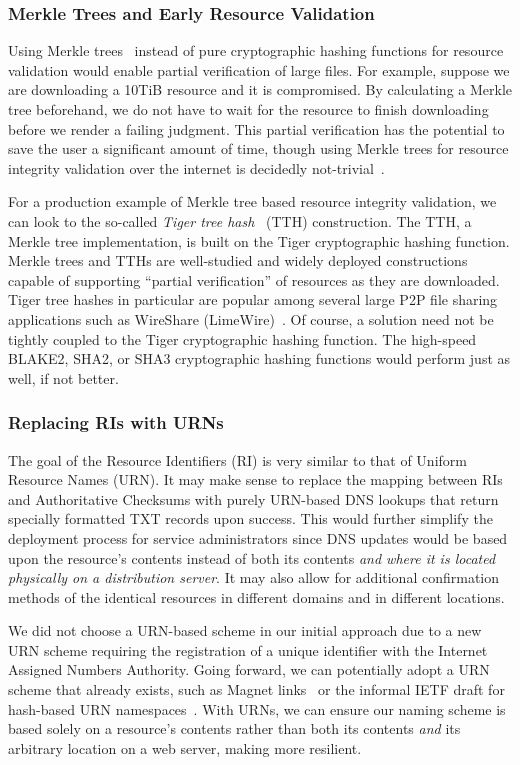\subsubsection{Merkle Trees and Early Resource Validation}

Using Merkle trees~\cite{Merkle} instead of pure cryptographic hashing functions
for resource validation would enable partial verification of large files. For
example, suppose we are downloading a 10TiB resource and it is compromised. By
calculating a Merkle tree beforehand, we do not have to wait for the resource to
finish downloading before we render a failing judgment. This partial verification has the potential
to save the user a significant amount of time, though using Merkle trees for
resource integrity validation over the internet is decidedly
not-trivial~\cite{Merkle-HTTP}.

For a production example of Merkle tree based resource integrity validation, we
can look to the so-called \emph{Tiger tree hash}~\cite{TTH, Merkle} (TTH)
construction. The TTH, a Merkle tree implementation, is built on the Tiger
cryptographic hashing function. Merkle trees and TTHs are well-studied and
widely deployed constructions capable of supporting ``partial verification'' of
resources as they are downloaded. Tiger tree hashes in particular are popular
among several large P2P file sharing applications such as WireShare
(LimeWire)~\cite{LimeWire}. Of course, a solution need not be tightly coupled to
the Tiger cryptographic hashing function. The high-speed BLAKE2, SHA2, or SHA3
cryptographic hashing functions would perform just as well, if not better.

\subsubsection{Replacing RIs with URNs}

The goal of the Resource Identifiers (RI) is very similar to that of Uniform
Resource Names (URN). It may make sense to replace the mapping between RIs and
Authoritative Checksums with purely URN-based DNS lookups that return specially
formatted TXT records upon success. This would further simplify the deployment
process for service administrators since DNS updates would be based upon the
resource's contents instead of both its contents \textit{and where it is located
physically on a distribution server}. It may also allow for additional
confirmation methods of the identical resources in different domains and in
different locations.

We did not choose a URN-based scheme in our initial approach due to a new URN
scheme requiring the registration of a unique identifier with the Internet
Assigned Numbers Authority. Going forward, we can potentially adopt a URN scheme
that already exists, such as Magnet links~\cite{MagnetLinks} or the informal
IETF draft for hash-based URN namespaces~\cite{draft-URN}. With URNs, we can
ensure our naming scheme is based solely on a resource's contents rather than
both its contents \emph{and} its arbitrary location on a web server, making
\SYSTEM{} more resilient.
